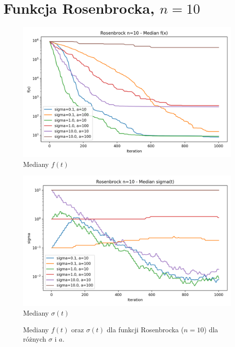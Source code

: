 \documentclass[a4paper,12pt]{article}
\begin{document}
\section{Funkcja Rosenbrocka, $n=10$}
\begin{figure}[H]
    \centering
    \begin{minipage}{0.48\textwidth}
        \centering
        \includegraphics[width=\textwidth]{charts/Rosenbrock_n10_all_medians.png}\\
        \small Mediany $f(t)$
    \end{minipage}\hfill
    \begin{minipage}{0.48\textwidth}
        \centering
        \includegraphics[width=\textwidth]{charts/Rosenbrock_n10_all_sigmas.png}\\
        \small Mediany $\sigma(t)$
    \end{minipage}
    \caption{Mediany $f(t)$ oraz $\sigma(t)$ dla funkcji Rosenbrocka ($n=10$) dla różnych $\sigma$ i $a$.}
\end{figure}
\end{document}
